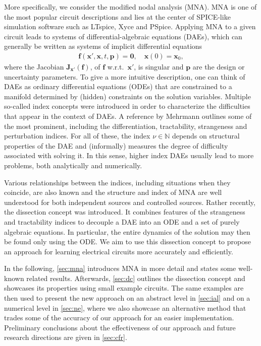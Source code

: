 \documentclass[AMA,STIX1COL]{WileyNJD-v2}
\newcommand{\mb}[1]{\mathbf{#1}}
\begin{document}
More specifically, we consider the modified nodal analysis\cite{ho1975} (MNA). MNA is one of the most popular circuit descriptions and lies at the center of SPICE-like simulation software such as LTspice\cite{ltspice}, Xyce\cite{xyce} and PSpice\cite{pspice}. Applying MNA to a given circuit leads to systems of differential-algebraic equations (DAEs), which can generally be written as systems of implicit differential equations \cite{denk1991}
\begin{align*}
    \mb{f}(\mb{x}', \mb{x}, t, \mb{p}) = \mb{0}, \quad \mb{x}(0) = \mb{x}_0,
\end{align*}
where the Jacobian $\mb{J}_{\mb{x}'}(\mb{f})$, of $\mb{f}$ w.r.t.~$\mb{x}'$, is singular and $\mb{p}$ are the design or uncertainty parameters. To give a more intuitive description, one can think of DAEs as ordinary differential equations (ODEs) that are constrained to a manifold determined by (hidden) constraints on the solution variables. Multiple so-called index concepts were introduced in order to characterize the difficulties that appear in the context of DAEs. A reference by Mehrmann\cite{mehrmann2015} outlines some of the most prominent, including the differentiation, tractability, strangeness and perturbation indices. For all of these, the index $\nu \in \mathbb{N}$ depends on structural properties of the DAE and (informally) measures the degree of difficulty associated with solving it. In this sense, higher index DAEs usually lead to more problems, both analytically and numerically.

Various relationships between the indices, including situations when they coincide, are also known\cite{mehrmann2015} and the structure and index of MNA are well understood for both independent sources\cite{tischendorf1999} and controlled sources\cite{estevez2000ijcta}. Rather recently, the dissection concept was introduced\cite{jansen2014}. It combines features of the strangeness and tractability indices to decouple a DAE into an ODE and a set of purely algebraic equations. In particular, the entire dynamics of the solution may then be found only using the ODE. We aim to use this dissection concept to propose an approach for learning electrical circuits more accurately and efficiently.

In the following, \autoref{sec:mna} introduces MNA in more detail and states some well-known related results. Afterwards, \autoref{sec:dc} outlines the dissection concept and showcases its properties using small example circuits. The same examples are then used to present the new approach on an abstract level in \autoref{sec:ial} and on a numerical level in \autoref{sec:ne}, where we also showcase an alternative method that trades some of the accuracy of our approach for an easier implementation. Preliminary conclusions about the effectiveness of our approach and future research directions are given in \autoref{sec:cfr}.
\end{document}
